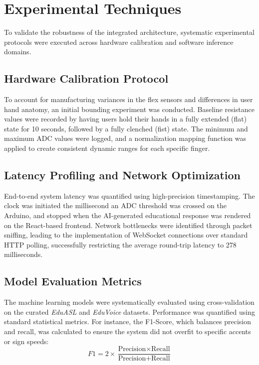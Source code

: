 \section{Experimental Techniques}
\label{sec:experimental_techniques}
To validate the robustness of the integrated architecture, systematic experimental protocols were executed across hardware calibration and software inference domains.

\subsection{Hardware Calibration Protocol}
To account for manufacturing variances in the flex sensors and differences in user hand anatomy, an initial bounding experiment was conducted. Baseline resistance values were recorded by having users hold their hands in a fully extended (flat) state for 10 seconds, followed by a fully clenched (fist) state. The minimum and maximum ADC values were logged, and a normalization mapping function was applied to create consistent dynamic ranges for each specific finger.

\subsection{Latency Profiling and Network Optimization}
End-to-end system latency was quantified using high-precision timestamping. The clock was initiated the millisecond an ADC threshold was crossed on the Arduino, and stopped when the AI-generated educational response was rendered on the React-based frontend. Network bottlenecks were identified through packet sniffing, leading to the implementation of WebSocket connections over standard HTTP polling, successfully restricting the average round-trip latency to 278 milliseconds.

\subsection{Model Evaluation Metrics}
The machine learning models were systematically evaluated using cross-validation on the curated \textit{EduASL} and \textit{EduVoice} datasets. Performance was quantified using standard statistical metrics. For instance, the F1-Score, which balances precision and recall, was calculated to ensure the system did not overfit to specific accents or sign speeds:
\begin{equation}
	F1 = 2 \times \frac{\text{Precision} \times \text{Recall}}{\text{Precision} + \text{Recall}}
\end{equation}

